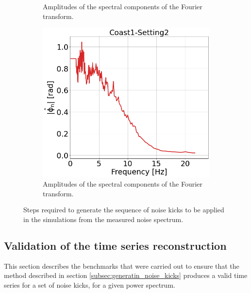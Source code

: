 \begin{figure}[!ht]
\begin{subfigure}[t]{0.42\textwidth}
        \caption{Amplitudes of the spectral components of the Fourier transform.}
        \label{fig:coast1_setting2_d}
    \end{subfigure}
    \hfill
    \centering
    \begin{subfigure}[t]{0.42\textwidth}
        \includegraphics[width=1\textwidth]{./images/app_B/coast1_setting2_yn_fft.png}
        \caption{Amplitudes of the spectral components of the Fourier transform. %
        }
        \label{fig:coast1_setting2_e}
    \end{subfigure}
    \hfill
    \hfill
    \caption{Steps required to generate the sequence of noise kicks to be applied in the simulations from the measured noise spectrum.}
    \label{fig:noise_kick_generation}
\end{figure}


\subsection{Validation of the time series reconstruction}
This section describes the benchmarks that were carried out to ensure that the method described in section \ref{subsec:generatin_noise_kicks} produces a valid time series for a set of noise kicks, for a given power spectrum. 

